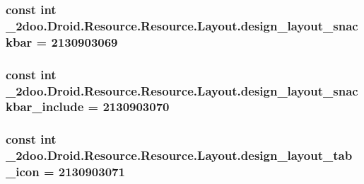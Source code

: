 \hypertarget{class__2doo_1_1_droid_1_1_resource_1_1_layout_f910a5c16721296e41c9c555a3863a3e}{
\subsubsection[{design\_\-layout\_\-snackbar}]{\setlength{\rightskip}{0pt plus 5cm}const int \_\-2doo.Droid.Resource.Resource.Layout.design\_\-layout\_\-snackbar = 2130903069}}
\label{class__2doo_1_1_droid_1_1_resource_1_1_layout_f910a5c16721296e41c9c555a3863a3e}


\hypertarget{class__2doo_1_1_droid_1_1_resource_1_1_layout_2b4da6be1ec2a0adf40ca214746a2b51}{
\subsubsection[{design\_\-layout\_\-snackbar\_\-include}]{\setlength{\rightskip}{0pt plus 5cm}const int \_\-2doo.Droid.Resource.Resource.Layout.design\_\-layout\_\-snackbar\_\-include = 2130903070}}
\label{class__2doo_1_1_droid_1_1_resource_1_1_layout_2b4da6be1ec2a0adf40ca214746a2b51}


\hypertarget{class__2doo_1_1_droid_1_1_resource_1_1_layout_00360a0a4d95bca335f77b825bed123d}{
\subsubsection[{design\_\-layout\_\-tab\_\-icon}]{\setlength{\rightskip}{0pt plus 5cm}const int \_\-2doo.Droid.Resource.Resource.Layout.design\_\-layout\_\-tab\_\-icon = 2130903071}}
\label{class__2doo_1_1_droid_1_1_resource_1_1_layout_00360a0a4d95bca335f77b825bed123d}


